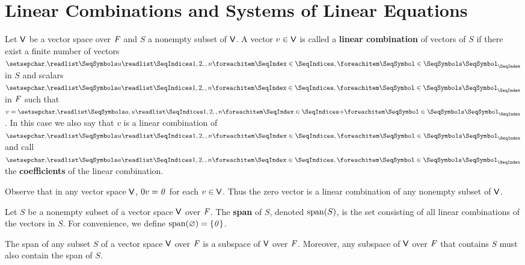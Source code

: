 \section{Linear Combinations and Systems of Linear Equations}\label{sec:1.4}

\begin{defn}\label{1.4.1}
	Let \(\mathsf{V}\) be a vector space over \(\mathit{F}\) and \(S\) a nonempty subset of \(\mathsf{V}\).
	A vector \(v \in \mathsf{V}\) is called a \textbf{linear combination} of vectors of \(S\) if there exist a finite number of vectors \(\seq{u}{1,2,,n}\) in \(S\) and scalars \(\seq{a}{1,2,,n}\) in \(\mathit{F}\) such that \(v = \seq[+]{a,u}{1,2,,n}\).
	In this case we also say that \(v\) is a linear combination of \(\seq{u}{1,2,,n}\) and call \(\seq{a}{1,2,,n}\) the \textbf{coefficients} of the linear combination.
\end{defn}

\begin{eg}\label{1.4.2}
	Observe that in any vector space \(\mathsf{V}\), \(0v = \mathit{0}\) for each \(v \in \mathsf{V}\).
	Thus the zero vector is a linear combination of any nonempty subset of \(\mathsf{V}\).
\end{eg}

\begin{defn}\label{1.4.3}
	Let \(S\) be a nonempty subset of a vector space \(\mathsf{V}\) over \(\mathit{F}\).
	The \textbf{span} of \(S\), denoted \(\spn{S}\), is the set consisting of all linear combinations of the vectors in \(S\).
	For convenience, we define \(\spn{\varnothing} = \set{\zv}\).
\end{defn}

\begin{thm}\label{1.5}
	The span of any subset \(S\) of a vector space \(\mathsf{V}\) over \(\mathit{F}\) is a subspace of \(\mathsf{V}\) over \(\mathit{F}\).
	Moreover, any subspace of \(\mathsf{V}\) over \(\mathit{F}\) that contains \(S\) must also contain the span of \(S\).
\end{thm}

